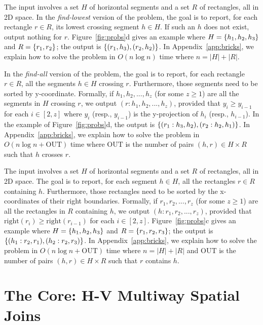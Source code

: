 \documentclass[sigconf]{acmart}
\def\vgap{\vspace{1mm}}
\def\extraspacing{\vspace{2mm} \noindent}
\def\xright{\mathrm{right}}
\def\out{\mathrm{OUT}}
\begin{document}
\extraspacing {\bf Problem $\bm{\mathscr{D}}$.} The input involves a set $H$ of horizontal segments and a set $R$ of rectangles, all in 2D space. In the {\em find-lowest} version of the problem, the goal is to report, for each rectangle $r \in R$, its lowest crossing segment $h \in H$. If such an $h$ does not exist, output nothing for $r$.  Figure~\ref{fig:probs}d gives an example where $H = \{h_1, h_2, h_3\}$ and $R = \{r_1, r_2\}$; the output is $\{(r_1, h_3), (r_2, h_2)\}$. In Appendix~\ref{app:bricks}, we explain how to solve the problem in $O(n \log n)$ time where $n = |H| + |R|$.

\vgap

In the {\em find-all} version of the problem, the goal is to report, for each rectangle $r \in R$, all the segments $h \in H$ crossing $r$. Furthermore, those segments need to be sorted by y-coordinate. Formally, if $h_1, h_2, ..., h_z$ (for some $z \ge 1$) are all the segments in $H$ crossing $r$, we output $(r: h_1, h_2, ..., h_z)$, provided that $y_i \ge y_{i-1}$ for each $i \in [2, z]$ where $y_i$ (resp., $y_{i-1}$) is the y-projection of $h_i$ (resp., $h_{i-1}$). In the example of Figure~\ref{fig:probs}d, the output is $\{(r_1: h_3, h_2), (r_2: h_2, h_1)\}$. In Appendix~\ref{app:bricks}, we explain how to solve the problem in $O(n \log n + \out)$ time where $\out$ is the number of pairs $(h, r) \in H \times R$ such that $h$ crosses $r$.


\extraspacing {\bf Problem $\bm{\mathscr{E}}$.} The input involves a set $H$ of horizontal segments and a set $R$ of rectangles, all in 2D space. The goal is to report, for each segment $h \in H$, all the rectangles $r \in R$ containing $h$. Furthermore, those rectangles need to be sorted by the x-coordinates of their right boundaries. Formally, if $r_1, r_2, ..., r_z$ (for some $z \ge 1$) are all the rectangles in $R$ containing $h$, we output $(h: r_1, r_2, ..., r_z)$, provided that $\xright(r_i) \ge \xright(r_{i-1})$ for each $i \in [2, z]$. Figure~\ref{fig:probs}c gives an example where $H = \{h_1, h_2, h_3\}$ and $R = \{r_1, r_2, r_3\}$; the output is $\{(h_1: r_2, r_1), (h_2: r_2, r_3)\}$. In Appendix~\ref{app:bricks}, we explain how to solve the problem in $O(n \log n + \out)$ time where $n = |H| + |R|$ and $\out$ is the number of pairs $(h, r) \in H \times R$ such that $r$ contains $h$.


\section{The Core: H-V Multiway Spatial Joins} \label{sec:hv}
\end{document}
